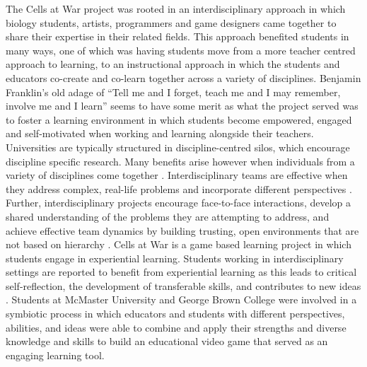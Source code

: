 \documentclass[10pt]{article}
\begin{document}
The Cells at War project was rooted in an interdisciplinary approach in which biology students, artists, programmers and game designers came together to share their expertise in their related fields. This approach benefited students in many ways, one of which was having students move from a more teacher centred approach to learning, to an instructional approach in which the students and educators co-create and co-learn together across a variety of disciplines. Benjamin Franklin’s old adage of “Tell me and I forget, teach me and I may remember, involve me and I learn” seems to have some merit as what the project served was to foster a learning environment in which students become empowered, engaged and self-motivated when working and learning alongside their teachers. Universities are typically structured in discipline-centred silos, which encourage discipline specific research. Many benefits arise however when individuals from a variety of disciplines come together \citep{snow201026,martin2020value}. Interdisciplinary teams are effective when they address complex, real-life problems and incorporate different perspectives \citep{beers2006common, choi2007multidisciplinarity, fischer2005knowledge, massey2006crossing, martin2020value}. Further, interdisciplinary projects encourage face-to-face interactions, develop a shared understanding of the problems they are attempting to address, and achieve effective team dynamics by building trusting, open environments that are not based on hierarchy \citep{stokols2005vivo, fischer2005knowledge, bruusgaard2010we, martin2020value}. Cells at War is a game based learning project in which students engage in experiential learning. Students working in interdisciplinary settings are reported to benefit from experiential learning as this leads to critical self-reflection, the development of transferable skills, and contributes to new ideas \citep{gemmel2009comprehensive, martin2020value}. Students at McMaster University and George Brown College were involved in a symbiotic process in which educators and students with different perspectives, abilities, and ideas were able to combine and apply their strengths and diverse knowledge and skills to build an educational video game that served as an engaging learning tool.
\end{document}
